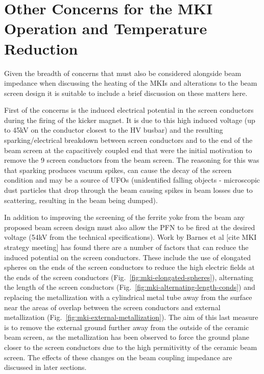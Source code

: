 \section{Other Concerns for the MKI Operation and Temperature Reduction}

Given the breadth of concerns that must also be considered alongside beam impedance when discussing the heating of the MKIs and alterations to the beam screen design it is suitable to include a brief discussion on these matters here. 

First of the concerns is the induced electrical potential in the screen conductors during the firing of the kicker magnet. It is due to this high induced voltage (up to 45kV on the conductor closest to the HV busbar) and the resulting sparking/electrical breakdown between screen conductors and to the end of the beam screen at the capacitively coupled end that were the initial motivation to remove the 9 screen conductors from the beam screen. The reasoning for this was that sparking produces vacuum spikes, can cause the decay of the screen condition and may be a source of UFOs (unidentified falling objects - microscopic dust particles that drop through the beam causing spikes in beam losses due to scattering, resulting in the beam being dumped). 

In addition to improving the screening of the ferrite yoke from the beam any proposed beam screen design must also allow the PFN to be fired at the desired voltage (54kV from the technical specifications). Work by Barnes et al [cite MKI strategy meeting] has found there are a number of factors that can reduce the induced potential on the screen conductors. These include the use of elongated spheres on the ends of the screen conductors to reduce the high electric fields at the ends of the screen conductors (Fig.~\ref{fig:mki-elongated-spheres}), alternating the length of the screen conductors (Fig.~\ref{fig:mki-alternating-length-conds}) and replacing the metallization with a cylindrical metal tube away from the surface near the areas of overlap between the screen conductors and external metallization (Fig.~\ref{fig:mki-external-metallization}). The aim of this last measure is to remove the external ground further away from the outside of the ceramic beam screen, as the metallization has been observed to force the ground plane closer to the screen conductors due to the high permitivitty of the ceramic beam screen. The effects of these changes on the beam coupling impedance are discussed in later sections.

